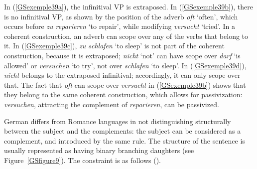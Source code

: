 {\eal
	\label{GSexemple39} 
	\label{GSexemple39a}

	\label{GSexemple39b}

	\label{GSexemple39c}	
		
	\label{GSexemple39d}
\zl

In (\ref{GSexemple39a}), the infinitival VP is extraposed. In (\ref{GSexemple39b}), there is no infinitival VP, as shown by the position of the adverb \emph{oft} `often', which occurs before \emph{zu reparieren} `to repair', while modifying \emph{versucht} `tried'. In a coherent construction, an adverb can scope over any of the verbs that belong to it. In (\ref{GSexemple39c}), \emph{zu schlafen} `to sleep' is not part of the coherent construction, because it is extraposed; \emph{nicht} `not' can have scope over \emph{darf} `is allowed' or \emph{versuchen} `to try', not over \emph{schlafen} `to sleep'. In (\ref{GSexemple39d}), \emph{nicht} belongs to the extraposed infinitival; accordingly, it can only scope over that. The fact that \emph{oft} can scope over \emph{versucht} in (\ref{GSexemple39b}) shows that they belong to the same coherent construction, which allows for passivization: \emph{versuchen}, attracting the complement of \emph{reparieren}, can be passivized.

German differs from Romance languages in not distinguishing structurally between the subject and the complements: the subject can be considered as a complement, and introduced by the same rule. The structure of the sentence is usually represented as having binary branching daughters (see Figure~\ref{GSfigure9}). The constraint is as follows (\citealt[21]{muller2018clause}).

}
